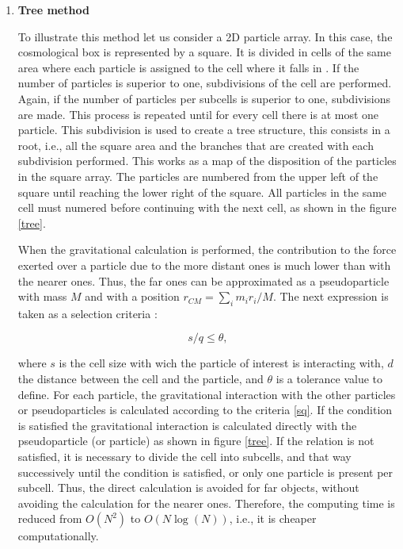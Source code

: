 \begin{enumerate}
\item \textbf{Tree method}


To illustrate this method let us consider a 2D particle array. 
In this case, the cosmological box is represented by a square.
It is divided in cells of the same area where
each particle is assigned to the cell where it falls in \cite{tree}. 
If the number of particles is superior to one, subdivisions 
of the cell are performed. Again, if the number of particles 
per subcells is superior to one, subdivisions are made. This
process is repeated until for every cell there is at most
one particle. 
This subdivision is used to create a tree structure, this consists
in a root, i.e., all the square area and the branches that are 
created with each subdivision performed. This works as a map
of the disposition of the particles in the square array. 
The particles are numbered from the upper left of the square 
until reaching the lower right of the square. All particles in the
same cell must numered before continuing with the next cell, as
shown in the figure \ref{tree}. 

When the gravitational calculation is performed, the contribution 
to the force exerted over a particle due to the more distant ones
is much lower than with the nearer ones. Thus, the far ones can be 
approximated as a pseudoparticle with mass $M$ and with a position
$r_{CM}=\sum_im_ir_i/M$. The next expression is taken as a selection 
criteria \cite{tree} : 

\begin{equation}
s/q\leq \theta,
\label{sq}
\end{equation}

where $s$ is the cell size with wich the particle of interest is interacting 
with, $d$ the distance between the cell and the particle,
and $\theta$ is a tolerance value to define. 
For each particle, the gravitational interaction with the other particles 
or pseudoparticles is calculated according to the criteria \ref{sq}. 
If the condition is satisfied the gravitational interaction 
is calculated directly with the pseudoparticle (or particle) as shown in figure \ref{tree}. 
If the relation is not satisfied, it is necessary to divide the cell into 
subcells, and that way successively until the condition is satisfied, or only one 
particle is present per subcell. Thus, the direct calculation is avoided for far
objects, without avoiding the calculation for the nearer ones. 
Therefore, the computing time is reduced from $O(N^2)$ to $O(N\log(N))$, i.e., it is cheaper
computationally. 


\end{enumerate}

